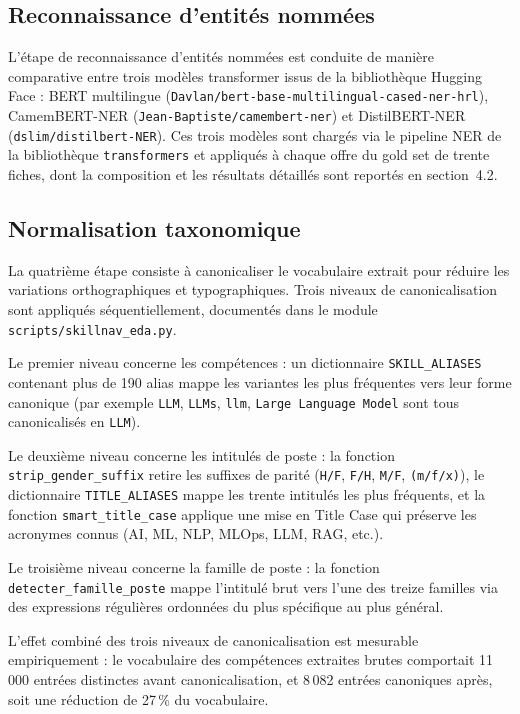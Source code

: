 \documentclass[11pt,a4paper,openany]{report}
\begin{document}
\subsection{Reconnaissance d'entit\'es nomm\'ees}

L'\'etape de reconnaissance d'entit\'es nomm\'ees est conduite de mani\`ere comparative entre trois mod\`eles transformer issus de la biblioth\`eque Hugging Face : BERT multilingue (\texttt{Davlan/bert-base-multilingual-cased-ner-hrl}), CamemBERT-NER (\texttt{Jean-Baptiste/camembert-ner}) et DistilBERT-NER (\texttt{dslim/distilbert-NER}). Ces trois mod\`eles sont charg\'es via le pipeline NER de la biblioth\`eque \texttt{transformers} et appliqu\'es \`a chaque offre du gold set de trente fiches, dont la composition et les r\'esultats d\'etaill\'es sont report\'es en section~4.2.

\subsection{Normalisation taxonomique}

La quatri\`eme \'etape consiste \`a canonicaliser le vocabulaire extrait pour r\'eduire les variations orthographiques et typographiques. Trois niveaux de canonicalisation sont appliqu\'es s\'equentiellement, document\'es dans le module \texttt{scripts/skillnav\_eda.py}.

Le premier niveau concerne les comp\'etences : un dictionnaire \texttt{SKILL\_ALIASES} contenant plus de 190 alias mappe les variantes les plus fr\'equentes vers leur forme canonique (par exemple \texttt{LLM}, \texttt{LLMs}, \texttt{llm}, \texttt{Large Language Model} sont tous canonicalis\'es en \texttt{LLM}).

Le deuxi\`eme niveau concerne les intitul\'es de poste : la fonction \texttt{strip\_gender\_suffix} retire les suffixes de parit\'e (\texttt{H/F}, \texttt{F/H}, \texttt{M/F}, \texttt{(m/f/x)}), le dictionnaire \texttt{TITLE\_ALIASES} mappe les trente intitul\'es les plus fr\'equents, et la fonction \texttt{smart\_title\_case} applique une mise en Title Case qui pr\'eserve les acronymes connus (AI, ML, NLP, MLOps, LLM, RAG, etc.).

Le troisi\`eme niveau concerne la famille de poste : la fonction \texttt{detecter\_famille\_poste} mappe l'intitul\'e brut vers l'une des treize familles via des expressions r\'eguli\`eres ordonn\'ees du plus sp\'ecifique au plus g\'en\'eral.

L'effet combin\'e des trois niveaux de canonicalisation est mesurable empiriquement : le vocabulaire des comp\'etences extraites brutes comportait 11\,000 entr\'ees distinctes avant canonicalisation, et 8\,082 entr\'ees canoniques apr\`es, soit une r\'eduction de 27\,\% du vocabulaire.
\end{document}
